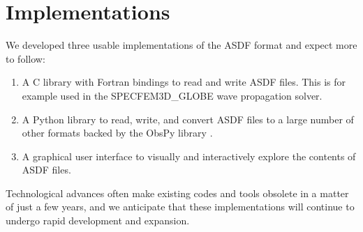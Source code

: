 \section{Implementations}

We developed three usable implementations of the ASDF format and expect more to
follow:

\begin{enumerate}
    \item A C library with Fortran bindings to read and write ASDF files. This
        is for example used in the SPECFEM3D\_GLOBE
        \cite{KoTr02a, KoTr02b} wave propagation solver.
    \item A Python library to read, write, and convert ASDF files to a large
        number of other formats backed by the ObsPy library \cite{Megies2011,
        Krischer2015}.
    \item A graphical user interface to visually and interactively explore the
        contents of ASDF files.
\end{enumerate}

Technological advances often make existing codes and tools obsolete in a matter
of just a few years, and we anticipate that these implementations will continue
to undergo rapid development and expansion.
